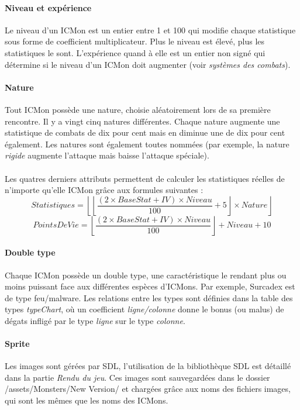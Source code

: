 \documentclass[12pt,a4paper, twoside]{article}
\begin{document}
        \paragraph{Niveau et expérience} Le niveau d'un ICMon est un entier entre 1 et 100 qui modifie chaque statistique sous forme de coefficient multiplicateur. Plus le niveau est élevé, plus les statistiques le sont. L'expérience quand à elle est un entier non signé qui détermine si le niveau d'un ICMon doit augmenter (voir \emph{systèmes des combats}).
        \paragraph{Nature} Tout ICMon possède une nature, choisie aléatoirement lors de sa première rencontre. Il y a vingt cinq natures différentes. Chaque nature augmente une statistique de combats de dix pour cent mais en diminue une de dix pour cent également. Les natures sont également toutes nommées (par exemple, la nature \emph{rigide} augmente l'attaque mais baisse l'attaque spéciale).\\
        \paragraph{} Les quatres derniers attributs permettent de calculer les statistiques réelles de n'importe qu'elle ICMon grâce aux formules suivantes :
        \begin{equation}
            \displaystyle{  Statistiques = \left \lfloor \left\lfloor \frac{(2 \times BaseStat + IV )\times Niveau }{100} +5 \right\rfloor \times Nature \right\rfloor  }
        \end{equation}
        \begin{equation}
            \displaystyle{  PointsDeVie = \left\lfloor \frac{(2 \times BaseStat + IV )\times Niveau}{100} \right\rfloor + Niveau + 10  }
        \end{equation}
        \paragraph{Double type} Chaque ICMon possède un double type, une caractéristique le rendant plus ou moins puissant face aux différentes espèces d'ICMons. Par exemple, Surcadex est de type feu/malware. Les relations entre les types sont définies dans la table des types \emph{typeChart}, où un coefficient \emph{ligne/colonne} donne le bonus (ou malus) de dégats infligé par le type \emph{ligne} sur le type \emph{colonne}.
        \paragraph{Sprite} Les images sont gérées par SDL, l'utilisation de la bibliothèque SDL est détaillé dans la partie \emph{Rendu du jeu}. Ces images sont sauvegardées dans le dossier /assets/Monsters/New Version/ et chargées grâce aux noms des fichiers images, qui sont les mêmes que les noms des ICMons.
\end{document}
